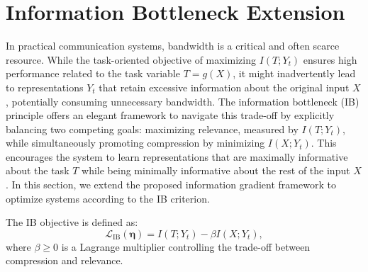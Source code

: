 \documentclass[conference]{IEEEtran}
\begin{document}

\section{Information Bottleneck Extension}
\label{sec:ib}

In practical communication systems, bandwidth is a critical and often scarce resource. 
While the task-oriented objective of maximizing $I(T; Y_t)$ ensures 
high performance related to the task variable $T=g(X)$, 
it might inadvertently lead to representations $Y_t$ 
that retain excessive information about the original input $X$, 
potentially consuming unnecessary bandwidth. 
The information bottleneck (IB) principle \cite{Tishby1999} 
offers an elegant framework to navigate this trade-off 
by explicitly balancing two competing goals: maximizing relevance, 
measured by $I(T; Y_t)$, while simultaneously promoting compression 
by minimizing $I(X; Y_t)$. This encourages the system to learn 
representations that are maximally informative about the task $T$ 
while being minimally informative about the rest of the input $X$. 
In this section, we extend the proposed information gradient framework 
to optimize systems according to the IB criterion.

The IB objective \cite{Tishby1999} is defined as:
\begin{equation}
\mathcal{L}_{\text{IB}}(\bm \eta) = I(T; Y_t) - \beta I(X; Y_t),
\label{eq:ib_objective}
\end{equation}
where $\beta \geq 0$ is a Lagrange multiplier controlling 
the trade-off between compression and relevance. 
\end{document}
